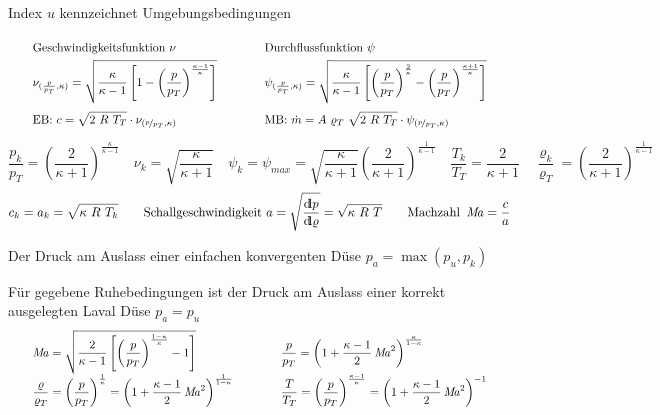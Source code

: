 	Index $ u $ kennzeichnet Umgebungsbedingungen
%
	\setlength{\abovedisplayskip}{0pt}
		\[ \arraycolsep=2em\def\arraystretch{2}
		\begin{array}{ll}
			  \text{Geschwindigkeitsfunktion }  \nu & \text{Durchflussfunktion }  \psi 
			\\
			   \nu_{(\frac{p}{p_T},\kappa)} = 
			  	\sqrt{\dfrac{\kappa}{\kappa-1}
			  		\left[1 -
			  			\left(\dfrac{p}{p_T}\right)
			  				^{\frac{\kappa-1}{\kappa}}
			  		\right]} 
			&  \psi_{(\frac{p}{p_T},\kappa)} = 
				\sqrt{ \dfrac{\kappa}{\kappa-1}
					\left[
						\left(\dfrac{p}{p_T}\right) 
							^{\frac{2}{\kappa}} 
							- 
						\left(\dfrac{p}{p_T}\right)
							^{\frac{\kappa+1}{\kappa}}
					\right]} 
			\\
			  \text{EB: } c = \displaystyle\sqrt{2\ R\ T_T} \cdot \nu_{(\nicefrac{p}{p_T},\kappa)} 
			& \text{MB: } \dot{m} = A\ \varrho_T\ \displaystyle\sqrt{2\ R\ T_T} \cdot \psi_{(\nicefrac{p}{p_T},\kappa)} 
		\end{array}\]
%
	\setlength{\abovedisplayshortskip}{0pt}
	\[ 
		\dfrac{p_k}{p_T} = 
			\left(\dfrac{2}{\kappa+1}\right)
				^{\frac{\kappa}{\kappa-1}}
	\quad
		\nu_k = \sqrt{\dfrac{\kappa}{\kappa+1}}
	\quad
		\psi_k = \psi_{max} = 
			\sqrt{\dfrac{\kappa}{\kappa+1}}
			\left(\dfrac{2}{\kappa+1}\right)
				^{\frac{1}{\kappa-1}}
	\quad
		\dfrac{T_k}{T_T} = \dfrac{2}{\kappa + 1}
	\quad	
		\dfrac{\varrho_k}{\varrho_T} = 
			\left(\dfrac{2}{\kappa+1}\right)
				^{\frac{1}{\kappa-1}}
	 \]
%	 
	\[ 
		c_k = a_k = \sqrt{\kappa \ R\ T_k}
	\qquad
		\text{Schallgeschwindigkeit }
		a = \sqrt{\dfrac{{\operatorname{d\!l}} p}{{\operatorname{d\!l}}\varrho}}
			= \sqrt{\kappa \ R\ T}
	\qquad
		\text{Machzahl }
		\operatorname{\mathit{M\kern-.20em a}} = \dfrac{c}{a}
	 \]

	Der Druck am Auslass einer einfachen konvergenten Düse $ p_a = \max(p_u, p_k) $
	
	Für gegebene Ruhebedingungen ist der Druck am Auslass einer korrekt ausgelegten Laval Düse $ p_a = p_u  $
%	
	\setlength{\abovedisplayskip}{10pt}
	\[ \arraycolsep=2em\def\arraystretch{2}
	\begin{array}{ll}
		\Mach  = 
		\sqrt{\dfrac{2}{\kappa-1}
			\left[\left(
				\dfrac{p}{p_T}
				\right)
					^{\frac{1-\kappa}{\kappa}} - 1
			\right]}
		& 
		\dfrac{p}{p_T}  = 
			\left( 1 +
				\dfrac{\kappa-1}{2}  \Mach^2
			\right)
				^{\frac{\kappa}{1-\kappa}}
	\\
		\dfrac{\varrho}{\varrho_T}  = 
		\left( \dfrac{p}{p_T} \right)
			^{\frac{1}{\kappa}} =
		\left( 1 +
			\dfrac{\kappa-1}{2}  \Mach^2
		\right)
			^{\frac{1}{1-\kappa}}
		&
		\dfrac{T}{T_T}  = 
		\left( \dfrac{p}{p_T} \right)
			^{\frac{\kappa-1}{\kappa}} =
		\left( 1 +
			\dfrac{\kappa-1}{2}  \Mach^2
		\right)
			^{-1}
	\end{array}\]
	
